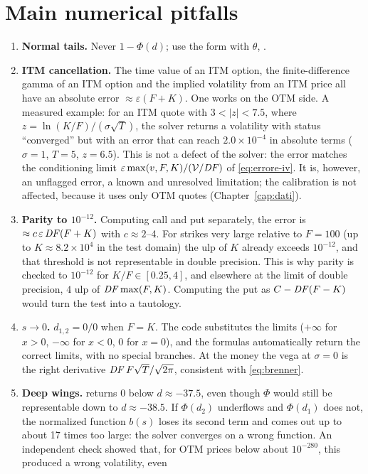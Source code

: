\section{Main numerical pitfalls}
\begin{enumerate}
\item \textbf{Normal tails.} Never $1-\Phi(d)$; use the form with $\theta$, .
\item \textbf{ITM cancellation.} The time value of an ITM option, the finite-difference gamma of an ITM option and
the implied volatility from an ITM price all have an absolute error $\approx\varepsilon(F+K)$. One works on the OTM
side. A measured example: for an ITM quote with $3<|z|<7.5$, where $z=\ln(K/F)/(\sigma\sqrt T)$, the solver returns a
volatility with status ``converged'' but with an error that can reach ${2.0\times10^{-4}}$ in absolute terms
($\sigma=1$, $T=5$, $z=6.5$). This is not a defect of the solver: the error matches the conditioning limit
$\varepsilon\max(v,F,K)/(\mathcal{V}/\mathit{DF})$ of \eqref{eq:errore-iv}. It is, however, an unflagged error, a known and
unresolved limitation; the calibration is not affected, because it uses only OTM quotes (Chapter~\ref{cap:dati}).
\item \textbf{Parity to $10^{-12}$.} Computing call and put separately, the error is
$\approx c\,\varepsilon\,\mathit{DF}(F+K)$ with $c\approx2$--4. For strikes very large relative to $F=100$ (up to
$K\approx{8.2\times10^4}$ in the test domain) the ulp of $K$ already exceeds $10^{-12}$, and that threshold is not
representable in double precision. This is why parity is checked to $10^{-12}$ for $K/F\in[0.25,4]$, and elsewhere
at the limit of double precision, $4$ ulp of $\mathit{DF}\max(F,K)$. Computing the put as $C-\mathit{DF}(F-K)$ would turn the test
into a tautology.
\item \textbf{$s\to0$.} $d_{1,2}=0/0$ when $F=K$. The code substitutes the limits ($+\infty$ for $x>0$, $-\infty$
for $x<0$, $0$ for $x=0$), and the formulas automatically return the correct limits, with no special branches. At the
money the vega at $\sigma=0$ is the right derivative $\mathit{DF}\,F\sqrt T/\sqrt{2\pi}$, consistent with
\eqref{eq:brenner}.
\item \textbf{Deep wings.}  returns 0 below $d\approx-37.5$, even though $\Phi$ would still be
representable down to $d\approx-38.5$. If $\Phi(d_2)$ underflows and $\Phi(d_1)$ does not, the normalized function
$b(s)$ loses its second term and comes out up to about 17 times too large: the solver converges on a wrong function.
An independent check showed that, for OTM prices below about $10^{-280}$, this produced a wrong volatility, even

\end{enumerate}
